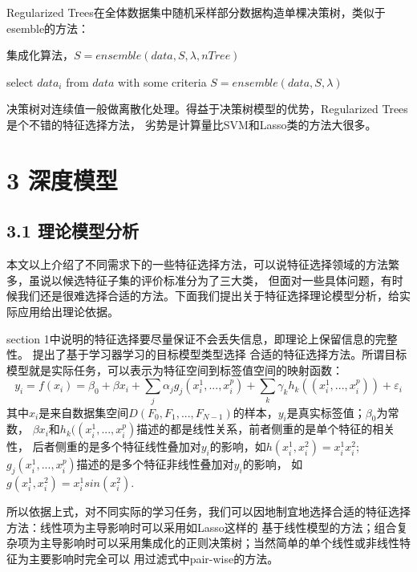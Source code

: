 \documentclass[a4paper,UTF8]{article}
\begin{document}
Regularized Trees在全体数据集中随机采样部分数据构造单棵决策树，类似于esemble的方法：
\begin{algorithm}
  \caption{集成化算法，$S=ensemble(data,S,\lambda,nTree)$}
  \begin{algorithmic}[1]

      \STATE select $data_{i}$ from $data$ with some criteria
      \STATE $S=ensemble(data,S,\lambda)$
    \ENDFOR
  \end{algorithmic}


\end{algorithm}

决策树对连续值一般做离散化处理。得益于决策树模型的优势，Regularized Trees是个不错的特征选择方法，
劣势是计算量比SVM和Lasso类的方法大很多。


\section*{3 深度模型}


\subsection*{3.1 理论模型分析}

本文以上介绍了不同需求下的一些特征选择方法，可以说特征选择领域的方法繁多，虽说以候选特征子集的评价标准分为了三大类，
但面对一些具体问题，有时候我们还是很难选择合适的方法。下面我们提出关于特征选择理论模型分析，给实际应用给出理论依据。

section 1中说明的特征选择要尽量保证不会丢失信息，即理论上保留信息的完整性。
\cite{DBLP:journals/mldm/MaresWG16}
提出了基于学习器学习的目标模型类型选择
合适的特征选择方法。所谓目标模型就是实际任务，可以表示为特征空间到标签值空间的映射函数：
$$y_{i}=f(x_{i})=\beta_{0}+\beta x_{i}+\sum_{j}{\alpha_{j} g_{j}(x_{i}^{1},...,x_{i}^{p})}
+\sum_{k}{\gamma_{k} h_{k}((x_{i}^{1},...,x_{i}^{p}))}+\varepsilon_{i}$$
其中$x_{i}$是来自数据集空间$D(F_{0}, F_{1},..., F_{N-1})$的样本，$y_{i}$是真实标签值；$\beta_{0}$为常数，
$\beta x_{i}$和$h_{k}((x_{i}^{1},...,x_{i}^{p})$描述的都是线性关系，前者侧重的是单个特征的相关性，
后者侧重的是多个特征线性叠加对$y_{i}$的影响，如$h(x_{i}^{1},x_{i}^{2})=x_{i}^{1}x_{i}^{2}$;
$g_{j}(x_{i}^{1},...,x_{i}^{p})$描述的是多个特征非线性叠加对$y_{i}$的影响，
如$g(x_{i}^{1},x_{i}^{2})=x_{i}^{1}sin(x_{i}^{2})$.

所以依据上式，对不同实际的学习任务，我们可以因地制宜地选择合适的特征选择方法：线性项为主导影响时可以采用如Lasso这样的
基于线性模型的方法；组合复杂项为主导影响时可以采用集成化的正则决策树；当然简单的单个线性或非线性特征为主要影响时完全可以
用过滤式中pair-wise的方法。
\end{document}
